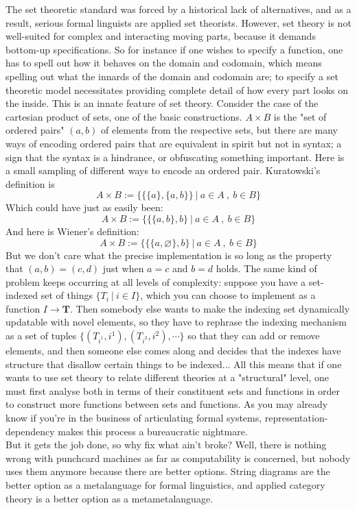 The set theoretic standard was forced by a historical lack of alternatives, and as a result, serious formal linguists are applied set theorists. However, set theory is not well-suited for complex and interacting moving parts, because it demands bottom-up specifications. So for instance if one wishes to specify a function, one has to spell out how it behaves on the domain and codomain, which means spelling out what the innards of the domain and codomain are; to specify a set theoretic model necessitates providing complete detail of how every part looks on the inside. This is an innate feature of set theory. Consider the case of the cartesian product of sets, one of the basic constructions. $A \times B$ is the "set of ordered pairs" $(a,b)$ of elements from the respective sets, but there are many ways of encoding ordered pairs that are equivalent in spirit but not in syntax; a sign that the syntax is a hindrance, or obfuscating something important. Here is a small sampling of different ways to encode an ordered pair. Kuratowski's definition is
\[A \times B := \bigg\{ \{\{a\},\{a,b\}\} \ | \ a \in A \ , \ b \in B \bigg\}\]
Which could have just as easily been:
\[A \times B := \bigg\{ \{\{a,b\},b\} \ | \ a \in A \ , \ b \in B \bigg\}\]
And here is Wiener's definition:
\[A \times B := \bigg\{ \{\{a,\varnothing\},b\} \ | \ a \in A \ , \ b \in B \bigg\}\]
But we don't care what the precise implementation is so long as the property that $(a,b) = (c,d)$ just when $a = c$ and $b = d$ holds. The same kind of problem keeps occurring at all levels of complexity: suppose you have a set-indexed set of things $\{T_i \ | \ i \in I\}$, which you can choose to implement as a function $I \rightarrow \mathbf{T}$. Then somebody else wants to make the indexing set dynamically updatable with novel elements, so they have to rephrase the indexing mechanism as a set of tuples $\{(T_{i^1},i^1), (T_{i^2},i^2), \cdots\}$ so that they can add or remove elements, and then someone else comes along and decides that the indexes have structure that disallow certain things to be indexed... All this means that if one wants to use set theory to relate different theories at a "structural" level, one must first analyse both in terms of their constituent sets and functions in order to construct more functions between sets and functions. As you may already know if you're in the business of articulating formal systems, representation-dependency makes this process a bureaucratic nightmare.\\

But it gets the job done, so why fix what ain't broke? Well, there is nothing wrong with punchcard machines as far as computability is concerned, but nobody uses them anymore because there are better options. String diagrams are the better option as a metalanguage for formal linguistics, and applied category theory is a better option as a metametalanguage.\\

